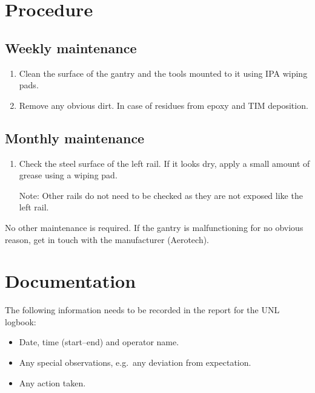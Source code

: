 \documentclass[12pt]{cornelltfpxsop}
\begin{document}

\section{Procedure}

\subsection{Weekly maintenance}
\begin{enumerate}
    \item Clean the surface of the gantry and the tools mounted to it using IPA wiping pads.
    \item Remove any obvious dirt. In case of residues from epoxy and TIM deposition.
\end{enumerate}

\subsection{Monthly maintenance}
\begin{enumerate}
    \item Check the steel surface of the left rail. If it looks dry, apply a small amount of grease using a wiping pad.

    Note: Other rails do not need to be checked as they are not exposed like the left rail.
\end{enumerate}
No other maintenance is required. If the gantry is malfunctioning for no obvious reason, get in touch with the manufacturer (Aerotech).

\section{Documentation}
The following information needs to be recorded in the report for the UNL logbook:
\begin{itemize}
    \item Date, time (start--end) and operator name.
    \item Any special observations, e.g.~any deviation from expectation.
    \item Any action taken.
\end{itemize}
\end{document}
